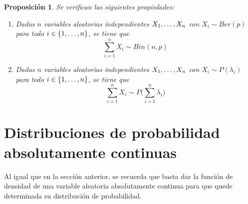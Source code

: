 \documentclass[11pt]{report}
\newtheorem{proposition}{Proposición}
\theoremstyle{definition}
\begin{document}
\begin{proposition}
Se verifican las siguientes propiedades:
\begin{enumerate}
    \item Dadas $n$ variables aleatorias independientes $X_1,\mathellipsis,X_n$ con $X_i \sim Ber(p)$ para todo $i \in \{1,\mathellipsis,n\}$, se tiene que
    \[\sum_{i=1}^n X_i \sim Bin(n,p)\]
    \item Dadas $n$ variables aleatorias independientes $X_1,\mathellipsis,X_n$ con $X_i \sim P(\lambda_i)$ para todo $i \in \{1,\mathellipsis,n\}$, se tiene que
    \[\sum_{i=1}^n X_i \sim P\bigl(\sum_{i=1}^n \lambda_i \bigr)\]
\end{enumerate}    
\end{proposition}

\section{Distribuciones de probabilidad absolutamente continuas}
\label{A.9}

Al igual que en la sección anterior, se recuerda que basta dar la función de densidad de una variable aleatoria absolutamente continua para que quede determinada su distribución de probabilidad.
\end{document}
